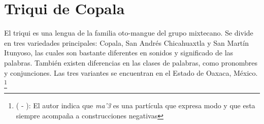\section*{Triqui de Copala}

\noindent El triqui es una lengua de la familia oto-mangue del grupo mixtecano. Se divide en tres variedades principales: Copala, San Andrés Chicahuaxtla y San Martín Itunyoso, las cuales son bastante diferentes en sonidos y significado de las palabras. También existen diferencias en las clases de palabras, como pronombres y conjunciones. Las tres variantes se encuentran en el Estado de Oaxaca, México.
\footnote{( - ): El autor indica que {\setmainfont{Charis SIL} \textit{ma'3}} es una partícula que expresa modo y que esta siempre acompaña a construcciones negativas}
\vspace{0.4cm}

